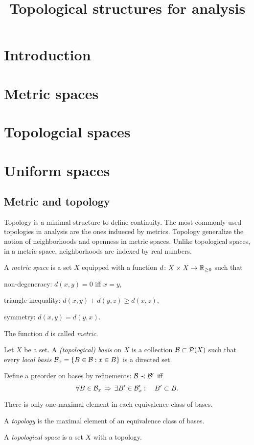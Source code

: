 \documentclass{../exp}
\title{Topological structures for analysis}
\begin{document}
\maketitle

\section{Introduction}


\section{Metric spaces}


\section{Topologcial spaces}


\section{Uniform spaces}
\subsection{Metric and topology}
Topology is a minimal structure to define continuity.
The most commonly used topologies in analysis are the ones indueced by metrics.
Topology generalize the notion of neighborhoods and openness in metric spaces.
Unlike topological spaces, in a metric space, neighborhoods are indexed by real numbers.

\begin{defn}
A \emph{metric space} is a set $X$ equipped with a function $d\colon X\x X\to\R_{\ge0}$ such that
\begin{cond}
\item non-degeneracy: $d(x,y)=0$ iff $x=y$,
\item triangle inequality: $d(x,y)+d(y,z)\ge d(x,z)$,
\item symmetry: $d(x,y)=d(y,x)$.
\end{cond}
The function $d$ is called \emph{metric}.
\end{defn}
\begin{defn}
Let $X$ be a set.
A \emph{(topological) basis} on $X$ is a collection $\mathcal{B}\subset\mathcal{P}(X)$ such that every \emph{local basis} $\mathcal{B}_x=\{B\in\mathcal{B}:x\in B\}$ is a directed set.
\end{defn}
Define a preorder on bases by refinements: $\mathcal{B}\prec\mathcal{B}'$ iff
\[\forall B\in\mathcal{B}_x\,\Rightarrow\,\exists B'\in\mathcal{B}'_x:\quad B'\subset B.\]
\begin{prop}
There is only one maximal element in each equivalence class of bases.
\end{prop}
\begin{defn}
A \emph{topology} is the maximal element of an equivalence class of bases.
\end{defn}
\begin{defn}
A \emph{topological space} is a set $X$ with a topology.
\end{defn}
\end{document}
